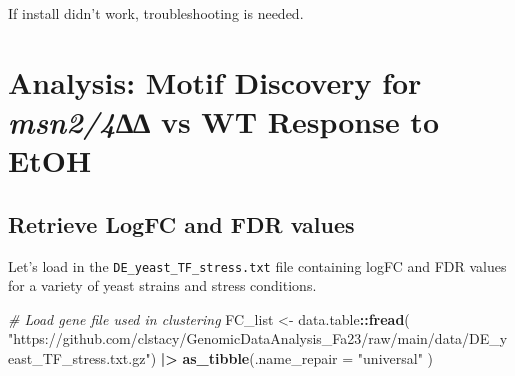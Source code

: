 \documentclass[
]{book}
\newenvironment{Shaded}{\begin{snugshade}}{\end{snugshade}}
\newcommand{\AttributeTok}[1]{\textcolor[rgb]{0.13,0.29,0.53}{#1}}
\newcommand{\CommentTok}[1]{\textcolor[rgb]{0.56,0.35,0.01}{\textit{#1}}}
\newcommand{\FunctionTok}[1]{\textcolor[rgb]{0.13,0.29,0.53}{\textbf{#1}}}
\newcommand{\NormalTok}[1]{#1}
\newcommand{\OtherTok}[1]{\textcolor[rgb]{0.56,0.35,0.01}{#1}}
\newcommand{\SpecialCharTok}[1]{\textcolor[rgb]{0.81,0.36,0.00}{\textbf{#1}}}
\newcommand{\StringTok}[1]{\textcolor[rgb]{0.31,0.60,0.02}{#1}}
\begin{document}
If install didn't work, troubleshooting is needed.

\hypertarget{analysis-motif-discovery-for-msn24-vs-wt-response-to-etoh}{%
\section{\texorpdfstring{Analysis: Motif Discovery for \emph{msn2/4}∆∆ vs WT Response to EtOH}{Analysis: Motif Discovery for msn2/4∆∆ vs WT Response to EtOH}}\label{analysis-motif-discovery-for-msn24-vs-wt-response-to-etoh}}

\hypertarget{retrieve-logfc-and-fdr-values}{%
\subsection{Retrieve LogFC and FDR values}\label{retrieve-logfc-and-fdr-values}}

Let's load in the \texttt{DE\_yeast\_TF\_stress.txt} file containing logFC and FDR
values for a variety of yeast strains and stress conditions.

\begin{Shaded}
\begin{Highlighting}[]
\CommentTok{\# Load gene file used in clustering}
\NormalTok{FC\_list }\OtherTok{\textless{}{-}}\NormalTok{ data.table}\SpecialCharTok{::}\FunctionTok{fread}\NormalTok{(}
  \StringTok{"https://github.com/clstacy/GenomicDataAnalysis\_Fa23/raw/main/data/DE\_yeast\_TF\_stress.txt.gz"}\NormalTok{) }\SpecialCharTok{|\textgreater{}}
  \FunctionTok{as\_tibble}\NormalTok{(}\AttributeTok{.name\_repair =} \StringTok{"universal"}
\NormalTok{)}
\end{Highlighting}
\end{Shaded}
\end{document}

